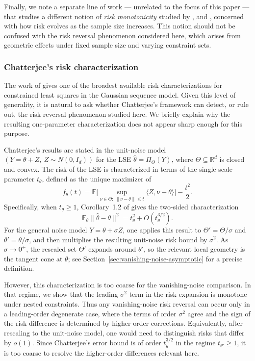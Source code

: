 \documentclass[11pt]{article}
\theoremstyle{plain}
\theoremstyle{definition}
\newcommand{\E}{\mathbb{E}}
\newcommand{\hattheta}{\hat{\theta}}
\begin{document}
Finally, we note a separate line of work --- unrelated to the focus of this paper --- that studies a different notion of \textit{risk monotonicity} studied by \cite{bousquet2022monotone}, \cite{mhammedi2021risk} and \cite{viering2020making}, concerned with how risk evolves as the sample size increases. This notion should not be confused with the risk reversal phenomenon considered here, which arises from geometric effects under fixed sample size and varying constraint sets.


\subsubsection{Chatterjee's risk characterization}
The work of \cite{Chatterjee14} gives one of the broadest available risk characterizations for constrained least squares in the Gaussian sequence model. Given this level of generality, it is natural to ask whether Chatterjee's framework can detect, or rule out, the risk reversal phenomenon studied here. We briefly explain why the resulting one-parameter characterization does not
appear sharp enough for this purpose.

Chatterjee's results are stated in the unit-noise model
$(Y=\theta+Z,\ Z\sim N(0,I_d))$ for the LSE
$\hattheta=\Pi_\Theta(Y)$, where $\Theta\subseteq\mathbb R^d$ is closed and
convex. The risk of the LSE is characterized in terms of the single scale
parameter $t_\theta$, defined as the unique maximizer of
\[
    f_\theta(t)
    =
    \E
    \bigg[
        \sup_{\nu\in\Theta:\ \|\nu-\theta\|\le t}
        \langle Z,\nu-\theta\rangle
    \bigg]
    -
    \frac{t^2}{2}.
\]
Specifically, when $t_\theta\ge1$, Corollary~1.2 of \cite{Chatterjee14} gives the two-sided
characterization
\[
    \E_\theta\|\hattheta-\theta\|^2
    =
    t_\theta^2+O(t_\theta^{3/2}).
\]
For the general noise model $Y=\theta+\sigma Z$, one applies this result to
$\Theta'=\Theta/\sigma$ and $\theta'=\theta/\sigma$, and then multiplies
the resulting unit-noise risk bound by $\sigma^2$. As $\sigma\to0^+$, the
rescaled set $\Theta'$ expands around $\theta'$, so the relevant local
geometry is the tangent cone at $\theta$; see
Section~\ref{sec:vanishing-noise-asymptotic} for a precise definition.

However, this characterization is too coarse for the vanishing-noise comparison.
In that regime, we show that the leading $\sigma^2$ term in the risk expansion is monotone under
nested constraints. Thus any vanishing-noise risk reversal can occur only in a
leading-order degenerate case, where the terms of order $\sigma^2$ agree and the sign
of the risk difference is determined by higher-order corrections. Equivalently,
after rescaling to the unit-noise model, one would need to distinguish risks
that differ by $o(1)$. Since Chatterjee's error bound is of order $t_{\theta'}^{3/2}$ in the regime $t_{\theta'}\ge1$, it is too coarse to resolve the higher-order differences relevant here.
\end{document}
